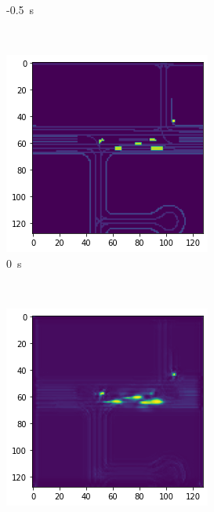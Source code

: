 \documentclass[12pt]{article}
\begin{document}
\begin{figure}[H]
\begin{subfigure}[b]{0.18\textwidth}
            \caption{-0.5~s}
        \end{subfigure}
        ~
        \begin{subfigure}[b]{0.18\textwidth}
            \includegraphics[width=\textwidth]{output_low_dens_2.png}
            \caption{0~s}
        \end{subfigure}
        ~
        \begin{subfigure}[b]{0.18\textwidth}
            \includegraphics[width=\textwidth]{output_low_dens_3.png}

\end{subfigure}
\end{figure}
\end{document}
